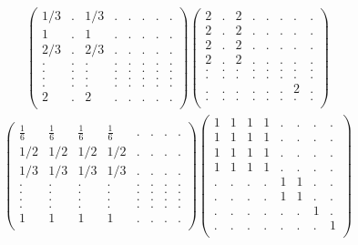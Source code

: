 \documentclass[12pt,a4paper]{amsart}
\begin{document}
\begin{align*}
\left(\begin{array}{rrrrrrrr}%
1/3&.&1/3&.&.&.&.&.\\%
1&.&1&.&.&.&.&.\\%
2/3&.&2/3&.&.&.&.&.\\%
.&.&.&.&.&.&.&.\\%
.&.&.&.&.&.&.&.\\%
.&.&.&.&.&.&.&.\\%
.&.&.&.&.&.&.&.\\%
2&.&2&.&.&.&.&.\\%
\end{array}\right)%
\left(\begin{array}{rrrrrrrr}%
2&.&2&.&.&.&.&.\\%
2&.&2&.&.&.&.&.\\%
2&.&2&.&.&.&.&.\\%
2&.&2&.&.&.&.&.\\%
.&.&.&.&.&.&.&.\\%
.&.&.&.&.&.&.&.\\%
.&.&.&.&.&.&2&.\\%
.&.&.&.&.&.&.&.\\%
\end{array}\right)%
\end{align*}
\begin{align*}
\left(\begin{array}{rrrrrrrr}%
\frac{1}{6}&\frac{1}{6}&\frac{1}{6}&\frac{1}{6}&.&.&.&.\\%
1/2&1/2&1/2&1/2&.&.&.&.\\%
1/3&1/3&1/3&1/3&.&.&.&.\\%
.&.&.&.&.&.&.&.\\%
.&.&.&.&.&.&.&.\\%
.&.&.&.&.&.&.&.\\%
.&.&.&.&.&.&.&.\\%
1&1&1&1&.&.&.&.\\%
\end{array}\right)%
\left(\begin{array}{rrrrrrrr}%
1&1&1&1&.&.&.&.\\%
1&1&1&1&.&.&.&.\\%
1&1&1&1&.&.&.&.\\%
1&1&1&1&.&.&.&.\\%
.&.&.&.&1&1&.&.\\%
.&.&.&.&1&1&.&.\\%
.&.&.&.&.&.&1&.\\%
.&.&.&.&.&.&.&1\\%
\end{array}\right)%
\end{align*}
\end{document}
